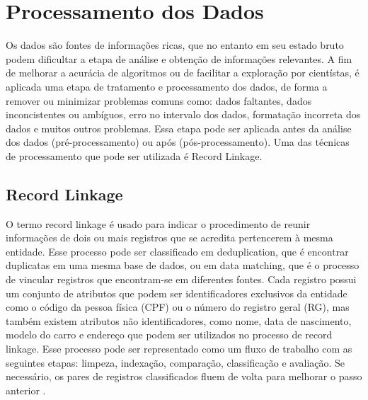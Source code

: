 \section{Processamento dos Dados}

Os dados são fontes de informações ricas, que no entanto em seu estado bruto podem dificultar a etapa de análise e obtenção de informações relevantes. A fim de melhorar a acurácia de algoritmos ou de facilitar a exploração por cientístas, é aplicada uma etapa de tratamento e processamento dos dados, de forma a remover ou minimizar problemas comuns como: dados faltantes, dados inconcistentes ou ambíguos, erro no intervalo dos dados, formatação incorreta dos dados e muitos outros problemas.
Essa etapa pode ser aplicada antes da análise dos dados (pré-processamento) ou após (pós-processamento). Uma das técnicas de processamento que pode ser utilizada é Record Linkage.

\subsection{Record Linkage}

O termo record linkage é usado para indicar o procedimento de reunir informações de dois ou mais registros que se acredita pertencerem à mesma entidade. Esse processo pode ser classificado em deduplication, que é encontrar duplicatas em uma mesma base de dados, ou em data matching, que é o processo de vincular registros que encontram-se em diferentes fontes.
Cada registro possui um conjunto de atributos que podem ser identificadores exclusivos da entidade como o código da pessoa física (CPF) ou o número do registro geral (RG), mas também existem atributos não identificadores, como nome, data de nascimento, modelo do carro e endereço que podem ser utilizados no processo de record linkage. Esse processo pode ser representado como um fluxo de trabalho com as seguintes etapas: limpeza, indexação, comparação, classificação e avaliação. Se necessário, os pares de registros classificados fluem de volta para melhorar o passo anterior \cite{christen2012data}.

